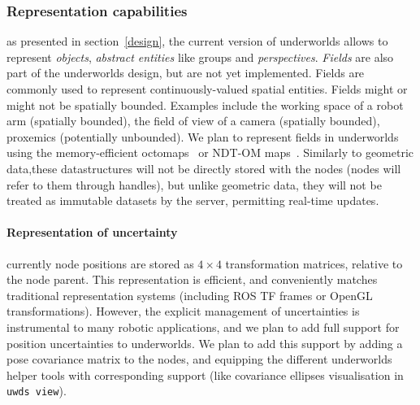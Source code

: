 \documentclass[letterpaper, 10pt, conference]{ieeeconf}
\newcommand{\uwds}{{\sc underworlds}\xspace}
\begin{document}
\subsubsection{Representation capabilities} as presented in
section~\ref{design}, the current version of \uwds allows to represent
\emph{objects}, \emph{abstract entities} like groups and \emph{perspectives}.
\emph{Fields} are also part of the \uwds design, but are not yet implemented.
Fields are commonly used to represent
continuously-valued spatial entities. Fields might or might not be spatially
bounded. Examples include the working space of a robot arm (spatially bounded),
the field of view of a camera (spatially bounded), proxemics (potentially
unbounded). We plan to represent fields in \uwds using the memory-efficient
octomaps~\cite{hornung2013octomap} or NDT-OM maps~\cite{saarinen20133d}.
Similarly to geometric data,these datastructures
will not be directly stored with the nodes (nodes will refer to them through 
handles), but unlike geometric data, they will not be treated as immutable
datasets by the server, permitting real-time updates.

\paragraph*{Representation of uncertainty} currently node positions are 
stored as $4\times4$ transformation matrices, relative to the node parent. This
representation is efficient, and conveniently matches traditional representation
systems (including ROS TF frames or OpenGL transformations). However, the explicit management
of uncertainties is instrumental to many robotic applications, and we plan to
add full support for position uncertainties to \uwds. We plan to add this
support by adding a pose covariance matrix to the nodes, and equipping the
different \uwds helper tools with corresponding support (like covariance
ellipses visualisation in {\tt uwds view}).


\end{document}
